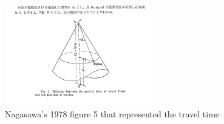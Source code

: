 \documentclass[linenum]{SSA-SRL}
\begin{document}
\vspace{0.5cm} 
\begin{figure} %
    \centering
    \includegraphics[width=0.6\textwidth]{Original79.jpeg} 
    \caption{Nagasawa's 1978 figure 5 that represented the travel time}
    \label{fig:nagasawa}
\end{figure}
\vspace{0.3cm} %
\end{document}

